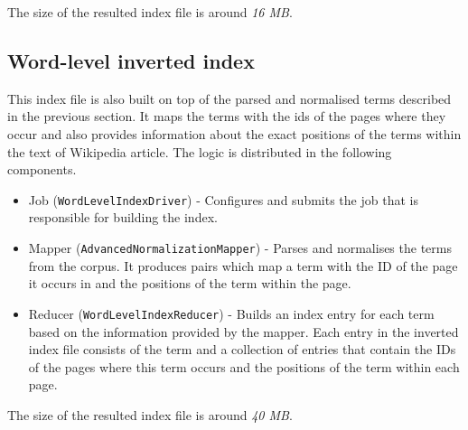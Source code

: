 \documentclass[a4paper, notitlepage]{report}
\begin{document}
The size of the resulted index file is around \emph{16 MB}.
\subsection{Word-level inverted index}
This index file is also built on top of the parsed and normalised terms described in the previous section. It maps the terms with the ids of the pages where they occur and also provides information about the exact positions of the terms within the text of Wikipedia article. The logic is distributed in the following components.

\begin{itemize}
	\item Job (\lstinline{WordLevelIndexDriver}) - Configures and submits the job that is responsible for building the index.
	\item Mapper (\lstinline{AdvancedNormalizationMapper}) - Parses and normalises the terms from the corpus. It produces pairs which map a term with the ID of the page it occurs in and the positions of the term within the page.
	\item Reducer (\lstinline{WordLevelIndexReducer}) - Builds an index entry for each term based on the information provided by the mapper. Each entry in the inverted index file consists of the term and a collection of entries that contain the IDs of the pages where this term occurs and the positions of the term within each page.  
\end{itemize}

The size of the resulted index file is around \emph{40 MB}.
\end{document}
